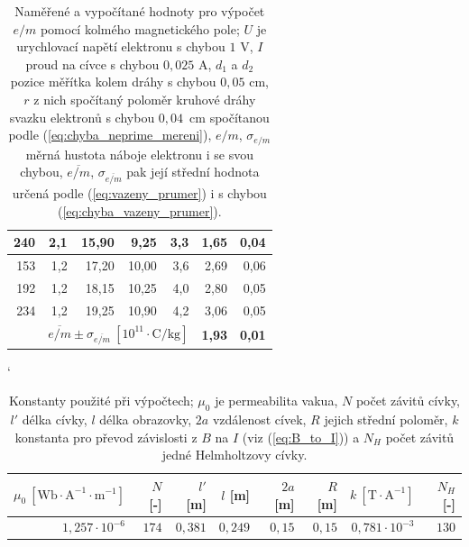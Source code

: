 \documentclass[english]{article}
\begin{document}
\begin{table}[htbp]
\begin{tabular}{|r|r|r|r|r|r|r|}
  \hline
  240   & 2,1   & 15,90 & 9,25  & 3,3   & 1,65  & 0,04 \bigstrut\\
  \hline
  153   & 1,2   & 17,20 & 10,00 & 3,6   & 2,69  & 0,06 \bigstrut\\
  \hline
  192   & 1,2   & 18,15 & 10,25 & 4,0   & 2,80  & 0,05 \bigstrut\\
  \hline
  234   & 1,2   & 19,25 & 10,90 & 4,2   & 3,06  & 0,05 \bigstrut\\
  \hline
  \multicolumn{1}{r|}{} & \multicolumn{4}{r|}{\boldmath{}\textbf{$\overline{e/m}\pm\sigma_{\overline{e/m}}~\mathrm{[10^{11}\cdot C/kg]}$}\unboldmath{}} & \textbf{1,93} & \textbf{0,01} \bigstrut\\
  \cline{2-7}\end{tabular}%
  
  
  \caption{Naměřené a vypočítané hodnoty pro výpočet $e/m$ pomocí kolmého magnetického pole; $U$ je urychlovací napětí elektronu s chybou $1$ V, $I$ proud na cívce s chybou $0,025$ A, $d_1$ a $d_2$ pozice měřítka kolem dráhy s chybou $0,05$ cm, $r$ z nich spočítaný poloměr kruhové dráhy svazku elektronů s chybou $0,04$~cm spočítanou podle (\ref{eq:chyba_neprime_mereni}), $e/m$, $\sigma_{e/m}$ měrná hustota náboje elektronu i se svou chybou, $\overline{e/m}$, $\sigma_{\overline{e/m}}$ pak její střední hodnota určená podle (\ref{eq:vazeny_prumer}) i s chybou (\ref{eq:chyba_vazeny_prumer}).}
  \label{tab:tab2}%
\end{table}%

\begin{table}[htbp]
\catcode` %
  \centering
\begin{tabular}{rrrrrrrr}
\toprule
\boldmath{}\textbf{$\mu_0~\mathrm{[Wb\cdot A^{-1}\cdot m^{-1}]}$}\unboldmath{} & \boldmath{}\textbf{$N$ [-]}\unboldmath{} & \boldmath{}\textbf{$l'$ [m]}\unboldmath{} & \boldmath{}\textbf{$l$ [m]}\unboldmath{} & \boldmath{}\textbf{$2a$ [m]}\unboldmath{} & \boldmath{}\textbf{$R$ [m]}\unboldmath{} & \boldmath{}\textbf{$k~\mathrm{[T\cdot A^{-1}]}$}\unboldmath{} & \boldmath{}\textbf{$N_H$ [-]}\unboldmath{} \\
\midrule
$1,257\cdot 10^{-6}$ & $174$ & $0,381$ & $0,249$ & $0,15$ & $0,15$ & $0,781\cdot 10^{-3}$ & $130$ \\
\bottomrule
\end{tabular}%

  \caption{Konstanty použité při výpočtech; $\mu_0$ je permeabilita vakua, $N$ počet závitů cívky, $l'$ délka cívky, $l$ délka obrazovky, $2a$ vzdálenost cívek, $R$ jejich střední poloměr, $k$ konstanta pro převod závislosti z $B$ na $I$ (viz (\ref{eq:B_to_I})) a $N_H$ počet závitů jedné Helmholtzovy cívky. }
  \label{tab:konstanty}%
\end{table}%
		
\end{document}
